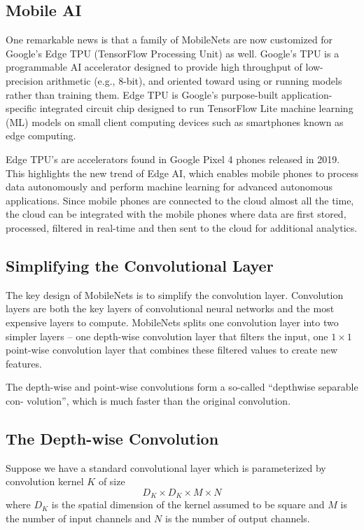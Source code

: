 \documentclass[11pt]{amsart}
\begin{document}
\subsection{Mobile AI}
One remarkable news is that a family of MobileNets are now customized for Google's Edge TPU (TensorFlow Processing Unit) as well. Google's TPU is a programmable AI accelerator designed to provide high throughput of low-precision arithmetic (e.g., 8-bit), and oriented toward using or running models rather than training them. Edge TPU is Google’s purpose-built application-specific integrated circuit chip designed to run TensorFlow Lite machine learning (ML) models on small client computing devices such as smartphones known as edge computing. 

Edge TPU's are accelerators found in Google Pixel 4 phones released in 2019. This highlights the new trend of Edge AI, which enables mobile phones to process data autonomously and perform machine learning for advanced autonomous applications. Since mobile phones are connected to the cloud almost all the time, the cloud can be integrated with the mobile phones where data are first stored, processed, filtered in real-time and then sent to the cloud for additional analytics.

\subsection{Simplifying the Convolutional Layer}
The key design of MobileNets is to simplify the convolution layer. Convolution layers are both the key layers of convolutional neural networks and the most expensive layers to compute. MobileNets splits one convolution layer into two simpler layers -- one depth-wise convolution layer that filters the input, one $1\times1$ point-wise convolution layer that combines these filtered values to create new features.

The depth-wise and point-wise convolutions form a so-called ``depthwise separable con- volution'', which is much faster than the original convolution.

\subsection{The Depth-wise Convolution}
Suppose we have a standard convolutional layer which is parameterized by convolution kernel $K$ of size\[
D_K\times D_K\times M\times N
\]where $D_K$ is the spatial dimension of the kernel assumed to be square and $M$ is the number of input channels and $N$ is the number of output channels.
\end{document}

